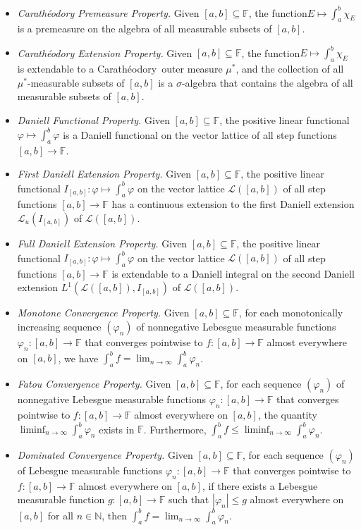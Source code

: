 \documentclass[11pt,a4paper]{article}
\def\DCP{\ensuremath{{\bf(DCP_{A})}}}
\def\CEP{\ensuremath{{\bf(CEP)}}}
\def\iDEP{\ensuremath{{\bf(DEP1)}}}
\def\iiDEP{\ensuremath{{\bf(DEP2)}}}
\def\F{\mathbb{F}}
\def\N{\mathbb{N}}
\def\MCP{\ensuremath{{\bf(MCP)}}}
\def\FCP{\ensuremath{{\bf(FCP)}}}
\def\DCP{\ensuremath{{\bf(DCP)}}}
\def\DFP{\ensuremath{{\bf(DFP)}}}
\def\CPP{\ensuremath{{\bf(CPP)}}}
\def\lbrak{\left[}
\def\rbrak{\right]}
\def\abClosed{\lbrak a,b\rbrak}
\def\stepLatt{\mathcal{L}}
\def\istepLatt{\stepLatt_u}
\def\into{\longrightarrow}
\def\sub{\subseteq}
\def\nseqlim{{\displaystyle\lim_{n\rightarrow\infty}}}
\def\nseqliminf{{\displaystyle\liminf_{n\rightarrow\infty}}}
\def\Cara{Carath\'{e}odory\  }
\begin{document}
\begin{itemize}
\item[\CPP] \emph{Carath\'{e}odory Premeasure Property.} Given $\abClosed\sub\F$, the function\linebreak $E\mapsto\int_a^b\chi_E$ is a premeasure on the algebra of all measurable subsets of $\abClosed$.
    \item[\CEP]\emph{Carath\'{e}odory Extension Property.} Given $\abClosed\sub\F$, the function\linebreak $E\mapsto\int_a^b\chi_E$ is extendable to a \Cara outer measure $\mu^*$, and the collection of all $\mu^*$-measurable subsets of $\abClosed$ is a $\sigma$-algebra that contains the algebra of all measurable subsets of $\abClosed$.
    \item[\DFP]\emph{Daniell Functional Property.} Given $\abClosed\sub\F$,  the positive linear functional $\varphi\mapsto\int_a^b\varphi$ is a Daniell functional on the vector lattice of all step functions $\abClosed\into\F$.
    \item[\iDEP]\emph{First Daniell Extension Property.} Given $\abClosed\sub\F$,  the positive linear functional $I_{\abClosed}:\varphi\mapsto\int_a^b\varphi$ on the vector lattice $\stepLatt(\abClosed)$ of all step functions $\abClosed\into\F$ has a continuous extension to the first Daniell extension $\istepLatt(I_{\abClosed})$ of $\stepLatt(\abClosed)$. 
\item[\iiDEP]\emph{Full Daniell Extension Property.} Given $\abClosed\sub\F$, the positive linear functional $I_{\abClosed}:\varphi\mapsto\int_a^b\varphi$ on the vector lattice $\stepLatt(\abClosed)$ of all step functions $\abClosed\into\F$ is extendable to a Daniell integral on the second Daniell extension $L^1(\stepLatt(\abClosed),I_{\abClosed})$ of $\stepLatt(\abClosed)$. 

    \item[\MCP]\emph{Monotone Convergence Property.} Given $\abClosed\sub\F$, for each monotonically increasing sequence $(\varphi_n)$ of nonnegative Lebesgue measurable functions $\varphi_n:\abClosed\into\F$ that converges pointwise to $f:\abClosed\into\F$ almost everywhere on $\abClosed$, we have $\int_a^bf=\nseqlim\int_a^b\varphi_n$.
    
    \item[\FCP]\emph{Fatou Convergence Property.} Given $\abClosed\sub\F$, for each sequence $(\varphi_n)$ of nonnegative Lebesgue measurable functions $\varphi_n:\abClosed\into\F$ that converges pointwise to $f:\abClosed\into\F$ almost everywhere on $\abClosed$, the quantity $\nseqliminf\int_a^b\varphi_n$ exists in $\F$. Furthermore, $\int_a^bf\leq\nseqliminf\int_a^b\varphi_n$.
    \item[\DCP]\emph{Dominated Convergence Property.} Given $\abClosed\sub\F$, for each sequence $(\varphi_n)$ of Lebesgue measurable functions $\varphi_n:\abClosed\into\F$ that converges pointwise to $f:\abClosed\into\F$ almost everywhere on $\abClosed$, if there exists a Lebesgue measurable function $g:\abClosed\into\F$ such that $|\varphi_n|\leq g$ almost everywhere on $\abClosed$ for all $n\in\N$, then $\int_a^bf=\nseqlim\int_a^b\varphi_n$.



\end{itemize}
\end{document}
